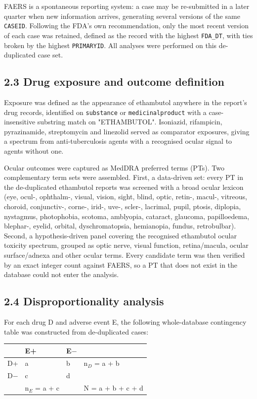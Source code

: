 \documentclass[utf8]{FrontiersinVancouver}
\begin{document}
FAERS is a spontaneous reporting system: a case may be re-submitted in a later quarter when new information arrives, generating several versions of the same \texttt{CASEID}. Following the FDA's own recommendation, only the most recent version of each case was retained, defined as the record with the highest \texttt{FDA\_DT}, with ties broken by the highest \texttt{PRIMARYID}. All analyses were performed on this de-duplicated case set.

\subsection{2.3 Drug exposure and outcome definition}

Exposure was defined as the appearance of ethambutol anywhere in the report's drug records, identified on \texttt{substance} or \texttt{medicinalproduct} with a case-insensitive substring match on "ETHAMBUTOL". Isoniazid, rifampicin, pyrazinamide, streptomycin and linezolid served as comparator exposures, giving a spectrum from anti-tuberculosis agents with a recognised ocular signal to agents without one.

Ocular outcomes were captured as MedDRA preferred terms (PTs). Two complementary term sets were assembled. First, a data-driven set: every PT in the de-duplicated ethambutol reports was screened with a broad ocular lexicon (eye, ocul-, ophthalm-, visual, vision, sight, blind, optic, retin-, macul-, vitreous, choroid, conjunctiv-, corne-, irid-, uve-, scler-, lacrimal, pupil, ptosis, diplopia, nystagmus, photophobia, scotoma, amblyopia, cataract, glaucoma, papilloedema, blephar-, eyelid, orbital, dyschromatopsia, hemianopia, fundus, retrobulbar). Second, a hypothesis-driven panel covering the recognised ethambutol ocular toxicity spectrum, grouped as optic nerve, visual function, retina/macula, ocular surface/adnexa and other ocular terms. Every candidate term was then verified by an exact integer count against FAERS, so a PT that does not exist in the database could not enter the analysis.

\subsection{2.4 Disproportionality analysis}

For each drug D and adverse event E, the following whole-database contingency table was constructed from de-duplicated cases:

\begin{table}[htbp]
\centering
\begin{tabular}{llll}
\hline
 & E+ & E$-$ &  \\
\hline
D+ & a & b & n$_{D}$ = a + b \\
D$-$ & c & d &  \\
 & n$_{E}$ = a + c &  & N = a + b + c + d \\
\hline
\end{tabular}
\end{table}
\end{document}
